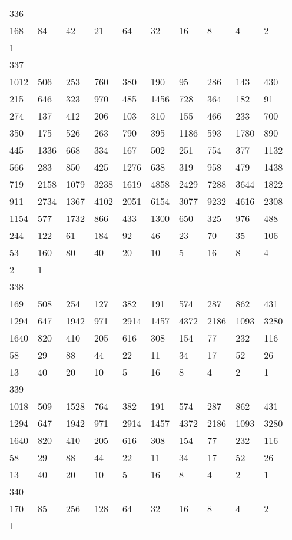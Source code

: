 \begin{longtable}{*{10}{l}}
336&&&&&&&&&\\
168& 84& 42& 21& 64& 32& 16& 8& 4& 2\\
1& \\

337&&&&&&&&&\\
1012& 506& 253& 760& 380& 190& 95& 286& 143& 430\\
215& 646& 323& 970& 485& 1456& 728& 364& 182& 91\\
274& 137& 412& 206& 103& 310& 155& 466& 233& 700\\
350& 175& 526& 263& 790& 395& 1186& 593& 1780& 890\\
445& 1336& 668& 334& 167& 502& 251& 754& 377& 1132\\
566& 283& 850& 425& 1276& 638& 319& 958& 479& 1438\\
719& 2158& 1079& 3238& 1619& 4858& 2429& 7288& 3644& 1822\\
911& 2734& 1367& 4102& 2051& 6154& 3077& 9232& 4616& 2308\\
1154& 577& 1732& 866& 433& 1300& 650& 325& 976& 488\\
244& 122& 61& 184& 92& 46& 23& 70& 35& 106\\
53& 160& 80& 40& 20& 10& 5& 16& 8& 4\\
2& 1& \\

338&&&&&&&&&\\
169& 508& 254& 127& 382& 191& 574& 287& 862& 431\\
1294& 647& 1942& 971& 2914& 1457& 4372& 2186& 1093& 3280\\
1640& 820& 410& 205& 616& 308& 154& 77& 232& 116\\
58& 29& 88& 44& 22& 11& 34& 17& 52& 26\\
13& 40& 20& 10& 5& 16& 8& 4& 2& 1\\

339&&&&&&&&&\\
1018& 509& 1528& 764& 382& 191& 574& 287& 862& 431\\
1294& 647& 1942& 971& 2914& 1457& 4372& 2186& 1093& 3280\\
1640& 820& 410& 205& 616& 308& 154& 77& 232& 116\\
58& 29& 88& 44& 22& 11& 34& 17& 52& 26\\
13& 40& 20& 10& 5& 16& 8& 4& 2& 1\\

340&&&&&&&&&\\
170& 85& 256& 128& 64& 32& 16& 8& 4& 2\\
1& \\


\end{longtable}

